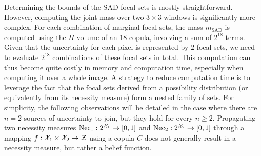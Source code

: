 Determining the bounds of the SAD focal sets is mostly straightforward. However, computing the joint mass over two $3 \times 3$ windows is significantly more complex. For each combination of marginal focal sets, the mass $m_{\mathrm{SAD}}$ is computed using the $H$-volume of an $18$-copula, involving a sum of $2^{18}$ terms. Given that the uncertainty for each pixel is represented by $2$ focal sets, we need to evaluate $2^{18}$ combinations of these focal sets in total. This computation can thus become quite costly in memory and computation time, especially when computing it over a whole image. A strategy to reduce computation time is to leverage the fact that the focal sets derived from a possibility distribution (or equivalently from its necessity measure) form a nested family of sets. For simplicity, the following observations will be detailed in the case where there are $n=2$ sources of uncertainty to join, but they hold for every $n\geqslant2$. Propagating two necessity measures $\mathrm{Nec}_1:2^{{\mathcal{X}}_1} \rightarrow [0,1]$ and $\mathrm{Nec}_2: 2^{{\mathcal{X}}_2} \rightarrow [0,1]$ through a mapping $f: {\mathcal{X}}_1 \times {\mathcal{X}}_2 \rightarrow \mathcal{Z}$ using a copula $C$ does not generally result in a necessity measure, but rather a belief function.

